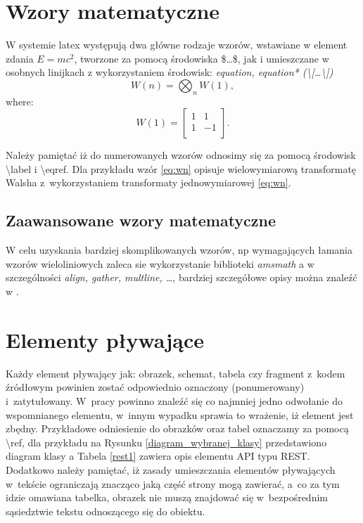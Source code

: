 \documentclass{wfiisul}
\begin{document}
\section{Wzory matematyczne}
W systemie latex występują dwa główne rodzaje wzorów, wstawiane w element zdania $E = mc^2$, tworzone za pomocą środowiska \$\dots\$, jak i umieszczane w osobnych linijkach z wykorzystaniem środowisk: \textit{equation, equation* (\textbackslash[\dots\textbackslash])}
\begin{equation}\label{eq:wn}
W(n) = \bigotimes_{n} W(1),
\end{equation}
where:
\begin{equation}\label{eq:w1}
W(1) = \begin{bmatrix}
         1 & 1 \\
         1 & -1 \\
       \end{bmatrix}.
\end{equation}

Należy pamiętać iż do numerowanych wzorów odnosimy się za pomocą środowisk {\textbackslash}label i {\textbackslash}eqref. Dla przykładu wzór \eqref{eq:wn} opisuje wielowymiarową transformatę Walsha z~wykorzystaniem transformaty jednowymiarowej \eqref{eq:wn}.

\subsection{Zaawansowane wzory matematyczne}
W celu uzyskania bardziej skomplikowanych wzorów, np wymagających łamania wzorów wieloliniowych zaleca sie wykorzystanie biblioteki \textit{amsmath} a w szczególności \textit{align, gather, multline, \dots}, bardziej szczegółowe opisy można znaleźć w \cite{latex_math_wiki}.

\section{Elementy pływające}
Każdy element pływający jak: obrazek, schemat, tabela czy fragment z~kodem źródłowym powinien zostać odpowiednio oznaczony (ponumerowany) i~zatytułowany. W~pracy powinno znaleźć się co najmniej jedno odwołanie do wspomnianego elementu, w~innym wypadku sprawia to wrażenie, iż element jest zbędny. Przykładowe odniesienie do obrazków oraz tabel oznaczamy za pomocą {\textbackslash}ref, dla przykładu na Rysunku \ref{diagram_wybranej_klasy} przedstawiono diagram klasy a Tabela \ref{rest1} zawiera opis elementu API typu REST. Dodatkowo należy pamiętać, iż zasady umieszczania elementów pływających w~tekście ograniczają znacząco jaką część strony mogą zawierać, a~co za tym idzie omawiana tabelka, obrazek nie muszą znajdować się w~bezpośrednim sąsiedztwie tekstu odnoszącego się do obiektu.
\end{document}
